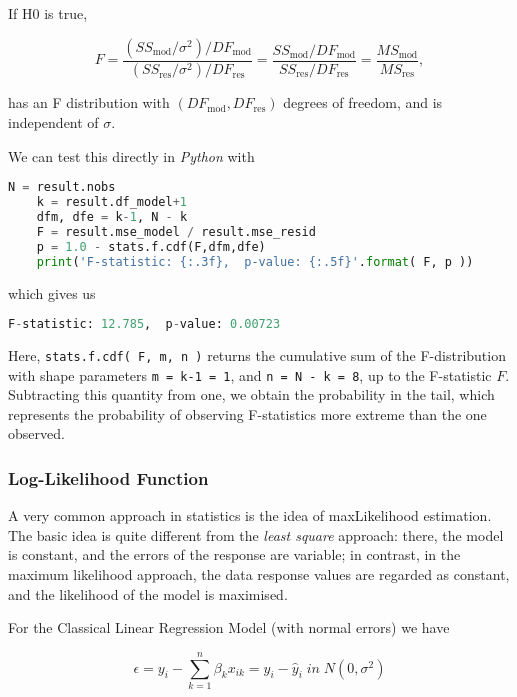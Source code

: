 If H0 is true,

\begin{equation}
  F = \frac{(SS_\text{mod}/\sigma^2)/DF_\text{mod}}{(SS_\text{res}/\sigma^2)/DF_\text{res}} = \frac{SS_\text{mod}/DF_\text{mod}}{SS_\text{res}/DF_\text{res}} = \frac{MS_\text{mod}}{MS_\text{res}},
\end{equation}

has an F distribution with $(DF_\text{mod}, DF_\text{res})$ degrees of freedom, and is independent of $\sigma$.

We can test this directly in \emph{Python} with

\begin{lstlisting}[language=Python]
    N = result.nobs
    k = result.df_model+1
    dfm, dfe = k-1, N - k
    F = result.mse_model / result.mse_resid
    p = 1.0 - stats.f.cdf(F,dfm,dfe)
    print('F-statistic: {:.3f},  p-value: {:.5f}'.format( F, p ))
\end{lstlisting}

which gives us

\begin{lstlisting}[language=Python]
    F-statistic: 12.785,  p-value: 0.00723
\end{lstlisting}

Here, \lstinline{stats.f.cdf( F, m, n )} returns the cumulative sum of the F-distribution with shape parameters \lstinline{m = k-1 = 1}, and \lstinline{n = N - k = 8}, up to the F-statistic $F$. Subtracting this quantity from one, we obtain the probability in the tail, which represents the probability of observing F-statistics more extreme than the one observed.

\subsubsection{Log-Likelihood Function}

A very common approach in statistics is the idea of \gls{maxLikelihood} estimation.  The basic idea is quite different from the \emph{least square} approach: there, the model is constant, and the errors of the response are variable; in contrast, in the maximum likelihood approach, the data response values are regarded as constant, and the likelihood of the model is maximised.

For the Classical Linear Regression Model (with normal errors) we have

\begin{equation}
  \epsilon = y_i - \sum_{k=1}^n \beta_k x_{ik} = y_i - \hat{y}_i \; in \; N(0, \sigma^2)
\end{equation}

